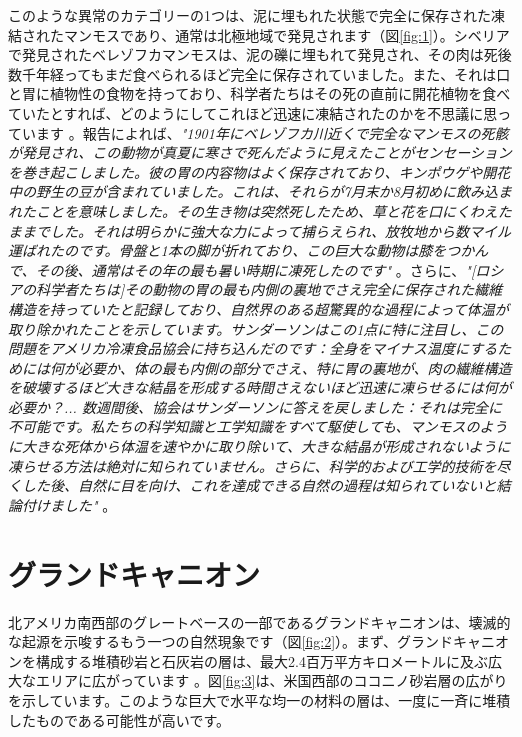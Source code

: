 \documentclass[10pt,twocolumn,letterpaper]{article}
\begin{document}
このような異常のカテゴリーの1つは、泥に埋もれた状態で完全に保存された凍結されたマンモスであり、通常は北極地域で発見されます（図\ref{fig:1}）。シベリアで発見されたベレゾフカマンモスは、泥の礫に埋もれて発見され、その肉は死後数千年経ってもまだ食べられるほど完全に保存されていました。また、それは口と胃に植物性の食物を持っており、科学者たちはその死の直前に開花植物を食べていたとすれば、どのようにしてこれほど迅速に凍結されたのかを不思議に思っています \cite{17}。報告によれば、\textit{"1901年にベレゾフカ川近くで完全なマンモスの死骸が発見され、この動物が真夏に寒さで死んだように見えたことがセンセーションを巻き起こしました。彼の胃の内容物はよく保存されており、キンポウゲや開花中の野生の豆が含まれていました。これは、それらが7月末か8月初めに飲み込まれたことを意味しました。その生き物は突然死したため、草と花を口にくわえたままでした。それは明らかに強大な力によって捕らえられ、放牧地から数マイル運ばれたのです。骨盤と1本の脚が折れており、この巨大な動物は膝をつかんで、その後、通常はその年の最も暑い時期に凍死したのです"} \cite{18}。さらに、\textit{"[ロシアの科学者たちは]その動物の胃の最も内側の裏地でさえ完全に保存された繊維構造を持っていたと記録しており、自然界のある超驚異的な過程によって体温が取り除かれたことを示しています。サンダーソンはこの1点に特に注目し、この問題をアメリカ冷凍食品協会に持ち込んだのです：全身をマイナス温度にするためには何が必要か、体の最も内側の部分でさえ、特に胃の裏地が、肉の繊維構造を破壊するほど大きな結晶を形成する時間さえないほど迅速に凍らせるには何が必要か？... 数週間後、協会はサンダーソンに答えを戻しました：それは完全に不可能です。私たちの科学知識と工学知識をすべて駆使しても、マンモスのように大きな死体から体温を速やかに取り除いて、大きな結晶が形成されないように凍らせる方法は絶対に知られていません。さらに、科学的および工学的技術を尽くした後、自然に目を向け、これを達成できる自然の過程は知られていないと結論付けました"} \cite{19}。

\section{グランドキャニオン}

北アメリカ南西部のグレートベースの一部であるグランドキャニオンは、壊滅的な起源を示唆するもう一つの自然現象です（図\ref{fig:2}）。まず、グランドキャニオンを構成する堆積砂岩と石灰岩の層は、最大2.4百万平方キロメートルに及ぶ広大なエリアに広がっています \cite{21}。図\ref{fig:3}は、米国西部のココニノ砂岩層の広がりを示しています。このような巨大で水平な均一の材料の層は、一度に一斉に堆積したものである可能性が高いです。
\end{document}
